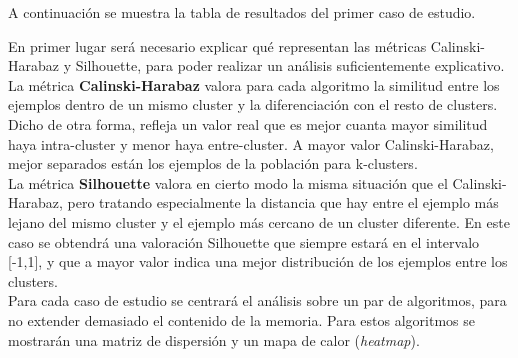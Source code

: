 	A continuación se muestra la tabla de resultados del primer caso de estudio.
	
	\begin{table}[H]
		\centering
		\caption{Resultados de los algoritmos de clustering para el primer caso de estudio.}
		\label{tablaTodos1}
	\end{table}

	En primer lugar será necesario explicar qué representan las métricas Calinski-Harabaz y Silhouette, para poder realizar un análisis suficientemente explicativo.\\
	
	La métrica \textbf{Calinski-Harabaz} valora para cada algoritmo la similitud entre los ejemplos dentro de un mismo cluster y la diferenciación con el resto de clusters. Dicho de otra forma, refleja un valor real que es mejor cuanta mayor similitud haya intra-cluster y menor haya entre-cluster. A mayor valor Calinski-Harabaz, mejor separados están los ejemplos de la población para k-clusters.\\
	
	La métrica \textbf{Silhouette} valora en cierto modo la misma situación que el Calinski-Harabaz, pero tratando especialmente la distancia que hay entre el ejemplo más lejano del mismo cluster y el ejemplo más cercano de un cluster diferente. En este caso se obtendrá una valoración Silhouette que siempre estará en el intervalo [-1,1], y que a mayor valor indica una mejor distribución de los ejemplos entre los clusters.\\

	Para cada caso de estudio se centrará el análisis sobre un par de algoritmos, para no extender demasiado el contenido de la memoria. Para estos algoritmos se mostrarán una matriz de dispersión y un mapa de calor (\textit{heatmap}).\\

